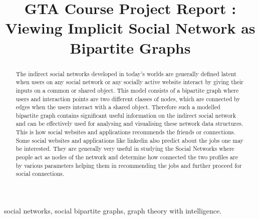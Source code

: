 \documentclass{article}
\title{GTA Course Project Report : Viewing Implicit Social Network as Bipartite Graphs}
\begin{document}
%
\maketitle
%
\begin{abstract}
The indirect social networks developed in today's worlds are generally defined latent when users on any social network or any socially active website interact by giving their inputs on a common or shared object. This model consists of a bipartite graph where users and interaction points are two different classes of nodes, which are connected by edges when the users interact with a shared object. Therefore such a modelled bipartite graph contains significant useful information on the indirect social network and can be effectively used for analysing and visualising these network data structures. This is how social websites and applications recommends the friends or connections. Some social websites and applications like linkedin also predict about the jobs one may be interested. They are generally very useful in studying the Social Networks where people act as nodes of the network and determine how connected the two profiles are by various parameters helping them in recommending the jobs and further proceed for social connections.
\end{abstract}

\begin{keywords}
social networks, social bipartite graphs, graph theory with intelligence.
\end{keywords}
\end{document}
